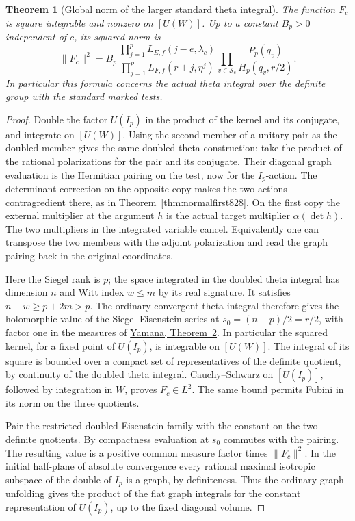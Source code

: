 \documentclass[a4paper,11pt]{article}
\newtheorem{theorem}[proposition]{Theorem}
\theoremstyle{definition}
\theoremstyle{remark}
\numberwithin{equation}{section}
\begin{document}
\begin{theorem}[Global norm of the larger standard theta integral]
\leavevmode\label{thm:thirdlargenorm839}
The function \(F_c\) is square integrable and nonzero on
\([U(W)]\). Up to a constant \(B_p>0\) independent of \(c\),
its squared norm is
\[
 \|F_c\|^2 =
 B_p\,
 \frac{\displaystyle\prod_{j=1}^{p}L_{E,f}(j-e,\lambda_c)}
      {\displaystyle\prod_{j=1}^{p}L_{F,f}(r+j,\eta^j)}
       \prod_{v\in\mathcal S_c}
                 \frac{P_p(q_v)}{H_p(q_v,r/2)} .
\]
In particular this formula concerns the actual theta integral
over the definite group with the standard marked tests.
\end{theorem}
\begin{proof}
Double the factor \(U(I_p)\) in the product of the kernel
and its conjugate, and integrate on \([U(W)]\). Using the
second member of a unitary pair as the doubled member gives
the same doubled theta construction: take the product of
the rational polarizations for the pair and its conjugate.
Their diagonal graph evaluation is the Hermitian pairing
on the test, now for the \(I_p\)-action. The determinant
correction on the opposite copy makes the two actions
contragredient there, as in Theorem~\ref{thm:normalfirst828}.
On the first copy the external multiplier at the argument
\(h\) is the actual target multiplier \(\alpha(\det h)\).
The two multipliers in the integrated variable cancel.
Equivalently one can transpose the two members with the
adjoint polarization and read the graph pairing back in
the original coordinates.

Here the Siegel rank is \(p\); the space integrated in the
doubled theta integral has dimension \(n\) and Witt index
\(w\le m\) by its real signature. It satisfies
\(n-w\ge p+2m>p\). The ordinary convergent theta integral
therefore gives the holomorphic value of the Siegel
Eisenstein series at \(s_0=(n-p)/2=r/2\), with factor one
in the measures of
\href{https://msp.org/pjm/2013/264-1/pjm-v264-n1-p11-s.pdf}
{Yamana, Theorem~2}. In particular the squared kernel,
for a fixed point of \(U(I_p)\), is integrable on \([U(W)]\).
The integral of its square is bounded over a compact set
of representatives of the definite quotient, by continuity
of the doubled theta integral. Cauchy--Schwarz on
\([U(I_p)]\), followed by integration in \(W\), proves
\(F_c\in L^2\). The same bound permits Fubini in its norm
on the three quotients.

Pair the restricted doubled Eisenstein family with the
constant on the two definite quotients. By compactness
evaluation at \(s_0\) commutes with the pairing. The resulting
value is a positive common measure factor times \(\|F_c\|^2\).
In the initial half-plane of absolute convergence every
rational maximal isotropic subspace of the double of \(I_p\)
is a graph, by definiteness. Thus the ordinary graph
unfolding gives the product of the flat graph integrals for
the constant representation of \(U(I_p)\), up to the fixed
diagonal volume.


\end{proof}
\end{document}

